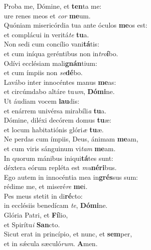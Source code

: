 \evenverse Proba me, Dómine, et \textbf{ten}ta me:~\*\\
\evenverse ure renes meos et \textit{cor} \textbf{me}um.\\
\oddverse Quóniam misericórdia tua ante óculos \textbf{me}os est:~\*\\
\oddverse et complácui in veritá\textit{te} \textbf{tu}a.\\
\evenverse Non sedi cum concílio vani\textbf{tá}tis:~\*\\
\evenverse et cum iníqua geréntibus non in\textit{tro}\textbf{í}bo.\\
\oddverse Odívi ecclésiam mali\textbf{gnán}tium:~\*\\
\oddverse et cum ímpiis non \textit{se}\textbf{dé}bo.\\
\evenverse Lavábo inter innocéntes manus \textbf{me}as:~\*\\
\evenverse et circúmdabo altáre tu\textit{um}, \textbf{Dó}\textbf{mi}ne.\\
\oddverse Ut áudiam vocem \textbf{lau}dis:~\*\\
\oddverse et enárrem univérsa mirabíli\textit{a} \textbf{tu}a.\\
\evenverse Dómine, diléxi decórem domus \textbf{tu}æ:~\*\\
\evenverse et locum habitatiónis glóri\textit{æ} \textbf{tu}æ.\\
\oddverse Ne perdas cum ímpiis, Deus, ánimam \textbf{me}am,~\*\\
\oddverse et cum viris sánguinum vi\textit{tam} \textbf{me}am.\\
\evenverse In quorum mánibus iniqui\textbf{tá}tes sunt:~\*\\
\evenverse déxtera eórum repléta est \textit{mu}\textbf{né}\textbf{ri}bus.\\
\oddverse Ego autem in innocéntia mea in\textbf{grés}sus sum:~\*\\
\oddverse rédime me, et miseré\textit{re} \textbf{me}i.\\
\evenverse Pes meus stetit in di\textbf{ré}cto:~\*\\
\evenverse in ecclésiis benedícam \textit{te}, \textbf{Dó}\textbf{mi}ne.\\
\oddverse Glória Patri, et \textbf{Fí}lio,~\*\\
\oddverse et Spirítu\textit{i} \textbf{San}cto.\\
\evenverse Sicut erat in princípio, et nunc, et \textbf{sem}per,~\*\\
\evenverse et in sǽcula sæculó\textit{rum}. \textbf{A}men.\\
